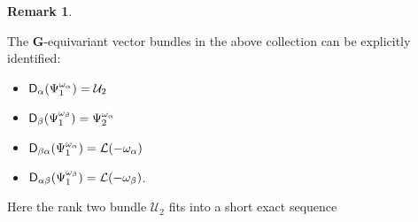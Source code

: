 \documentclass[sn-mathphys-num]{sn-jnl}%
\newcommand{\Uu}{\mathcal U}
\newcommand{\Ll}{\mathcal L}
\newcommand{\bg}{\mathbf G}
\theoremstyle{definition}
\newtheorem{remark}[theorem]{Remark}
\begin{document}
\begin{remark}\label{rem:identB_2}
{
The $ \bg$-equivariant vector bundles in the above collection can be explicitly identified: 

\begin{itemize}[(1)]

\item[(1)] ${\sf D}_{\alpha}(\Psi _1^{\omega _{\alpha}}) = \Uu _2$

\item[(2)] ${\sf D}_{\beta}(\Psi _1^{\omega _{\beta}}) = \Psi _2^{\omega _{\alpha}}$

\item[(3)] ${\sf D}_{\beta\alpha}(\Psi _1^{\omega _{\alpha}}) = \Ll (-\omega _{\alpha})$

\item[(4)] ${\sf D}_{\alpha\beta}(\Psi _1^{\omega _{\beta}}) = \Ll (-\omega _{\beta})$.

\end{itemize}
Here the rank two bundle $\Uu _2$ fits into a short exact sequence 

}
\end{remark}
\end{document}
